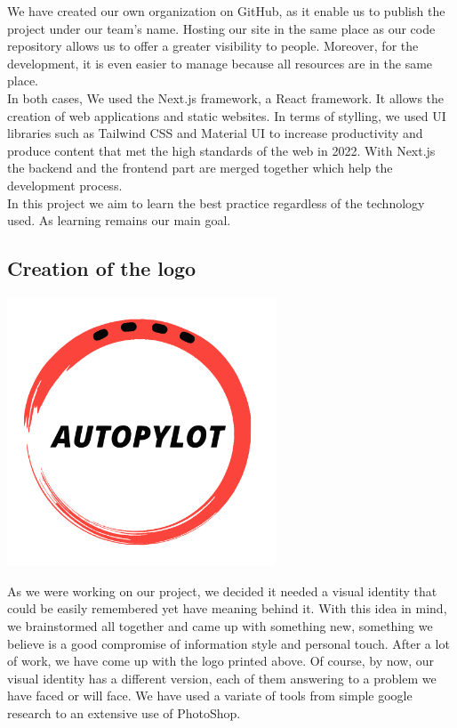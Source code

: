 \documentclass[12pt]{article}
\begin{document}
We have created our own organization on GitHub, as it enable us to publish the project under our team’s name. Hosting our site in the same place as our code repository allows us to offer a greater visibility to people. Moreover, for the development, it is even easier to manage because all resources are in the same place. \\

In both cases, We used the Next.js framework, a React framework. It allows the creation of web applications and static websites. In terms of stylling, we used UI libraries such as Tailwind CSS and Material UI to increase productivity and produce content that met the high standards of the web in 2022. With Next.js the backend and the frontend part are merged together which help the development process. \\

In this project we aim to learn the best practice regardless of the technology used. As learning remains our main goal.


\subsection{Creation of the logo}
\centerline{\includegraphics[height=8cm]{../../logos/logo-transparent-black.png}}

As we were working on our project, we decided it needed a visual identity that could be easily remembered yet have meaning behind it. With this idea in mind, we brainstormed all together and came up with something new, something we believe is a good compromise of information style and personal touch. After a lot of work, we have come up with the logo printed above. Of course, by now, our visual identity has a different version, each of them answering to a problem we have faced or will face. We have used a variate of tools from simple google research to an extensive use of PhotoShop.\\
\end{document}
